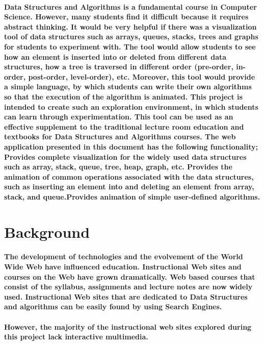 \documentclass{article}
\begin{document}
\paragraph{Data Structures and Algorithms is a fundamental course in Computer Science\cite{russell2016artificial}. However, many students find it difficult because it requires abstract thinking. It would be very helpful if there was a visualization tool of data structures such as arrays, queues, stacks, trees and graphs for students to experiment with. The tool would allow students to see how an element is inserted into or deleted from different data structures, how a tree is traversed in different order (pre-order, in-order, post-order, level-order), etc. Moreover, this tool would provide a simple language, by which students can write their own algorithms so that the execution of the algorithm is animated. This project is intended to create such an exploration environment, in which students can learn through experimentation. This tool can be used as an effective supplement to the traditional lecture room education and textbooks for Data Structures and Algorithms courses. The web application presented in this document has the following functionality; Provides complete visualization for the widely used data structures such as array, stack, queue, tree, heap, graph, etc\cite{hendrix2004extensible}. Provides the animation of common operations associated with the data structures, such as inserting an element into and deleting an element from array, stack, and queue.Provides animation of simple user-defined algorithms.}


\section{Background}
\paragraph{The development of technologies and the evolvement of the World Wide Web have influenced education. Instructional Web sites and courses on the Web have grown dramatically. Web based courses that consist of the syllabus, assignments and lecture notes are now widely used. Instructional Web sites that are dedicated to Data Structures and algorithms can be easily found by using Search Engines. }
\paragraph{However, the majority of the instructional web sites explored during this project lack interactive multimedia.}
\end{document}
